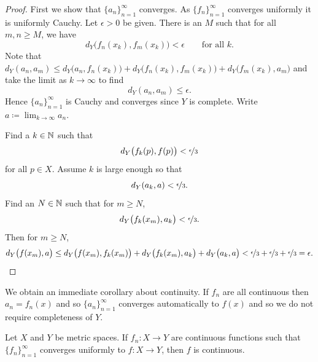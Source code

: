 \begin{proof}
First we show that $\{ a_n \}_{n=1}^\infty$ converges.  As
$\{ f_n \}_{n=1}^\infty$ converges uniformly it is uniformly Cauchy. 
Let $\epsilon > 0$ be given.  There is
an $M$ such that for all $m,n \geq M$, we have
\begin{equation*}
d_Y\bigl(f_n(x_k),f_m(x_k)\bigr) < \epsilon \qquad \text{for all } k .
\end{equation*}
Note that
$d_Y(a_n,a_m) \leq
d_Y\bigl(a_n,f_n(x_k)\bigr) +
d_Y\bigl(f_n(x_k),f_m(x_k)\bigr) +
d_Y\bigl(f_m(x_k),a_m\bigr)$ and take the limit as $k \to \infty$ to find
\begin{equation*}
d_Y(a_n,a_m) \leq \epsilon .
\end{equation*}
Hence $\{a_n\}_{n=1}^\infty$ is Cauchy and converges since $Y$ is complete.  Write
$a \coloneqq \lim_{k \to \infty} a_n$.

Find a $k \in {\mathbb{N}}$ such that
\begin{equation*}
d_Y\bigl(f_k(p),f(p)\bigr) < \nicefrac{\epsilon}{3}
\end{equation*}
for all $p \in X$.  Assume $k$ is large enough
so that
\begin{equation*}
d_Y(a_k,a) < \nicefrac{\epsilon}{3}  .
\end{equation*}
Find an $N \in {\mathbb{N}}$ such that for $m \geq N$,
\begin{equation*}
d_Y\bigl(f_k(x_m),a_k\bigr) < \nicefrac{\epsilon}{3}  .
\end{equation*}
Then for
$m \geq N$,
\begin{equation*}
d_Y\bigl(f(x_m),a\bigr)
\leq
d_Y\bigl(f(x_m),f_k(x_m)\bigr)
+
d_Y\bigl(f_k(x_m),a_k\bigr)
+
d_Y\bigl(a_k,a\bigr)
<
\nicefrac{\epsilon}{3} +
\nicefrac{\epsilon}{3} +
\nicefrac{\epsilon}{3} = \epsilon . \qedhere
\end{equation*}
\end{proof}

We obtain an immediate corollary about continuity.
If $f_n$ are all continuous then $a_n = f_n(x)$ and 
so $\{ a_n \}_{n=1}^\infty$ converges automatically to
$f(x)$ and so we do not require completeness of $Y$.

\begin{cor} \label{cor:metricuniformcontinuous}
Let $X$ and $Y$ be metric spaces.
If $f_n \colon X \to Y$ are continuous functions
such that
$\{ f_n \}_{n=1}^\infty$ converges uniformly to $f \colon X \to Y$,
then $f$ is continuous.
\end{cor}

